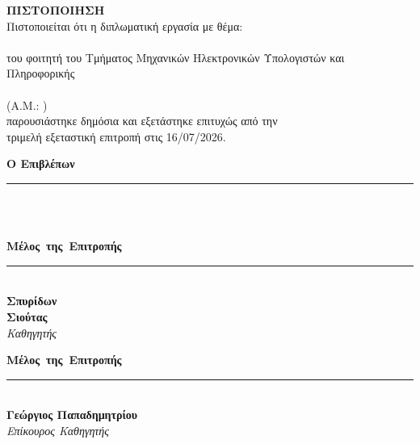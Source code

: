 \pagestyle{empty}
\begin{center}
    \vspace*{1cm}
    {\Huge \textbf{ΠΙΣΤΟΠΟΙΗΣΗ}}\\[1.5cm]
    
    \large Πιστοποιείται ότι η διπλωματική εργασία με θέμα:\\[0.6cm]
    \textbf{\Large \doctitle}\\[1cm]
    
    \large του φοιτητή του Τμήματος Μηχανικών Ηλεκτρονικών Υπολογιστών και Πληροφορικής\\[0.4cm]
    \textbf{\Large \me}\\[0.3cm]
    \large (Α.Μ.: \studnum)\\[1cm]
    
    παρουσιάστηκε δημόσια και εξετάστηκε επιτυχώς από την\\
    τριμελή εξεταστική επιτροπή στις  16/07/2026.\\[1.5cm]
\end{center}


\vspace{1cm} %
\noindent
\begin{minipage}[t]{0.31\textwidth}
    \centering\large
    \textbf{Ο Επιβλέπων}\\[0,6cm] 
    \rule{4.5cm}{0.4pt}\\[0.2cm]
    \normalsize\textbf{\supname}\\
    \emph{\suptitle}
\end{minipage}%
\hfill
\begin{minipage}[t]{0.31\textwidth}
    \centering\large
    \textbf{Μέλος~της~Επιτροπής}\\[0.6cm]
    \rule{4.5cm}{0.4pt}\\[0.2cm]
    \normalsize\textbf{Σπυρίδων\\ Σιούτας}\\ %
    \emph{Καθηγητής}
\end{minipage}%
\hfill
\begin{minipage}[t]{0.31\textwidth}
    \centering\large
    \textbf{Μέλος~της~Επιτροπής}\\[0.6cm]
    \rule{4.5cm}{0.4pt}\\[0.2cm]
    \normalsize\textbf{Γεώργιος Παπαδημητρίου}\\
    \emph{Επίκουρος Καθηγητής}
\end{minipage}